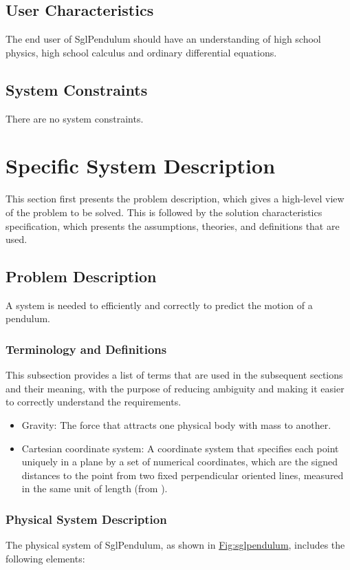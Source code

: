 \documentclass[12pt]{article}
\begin{document}
\subsection{User Characteristics}
\label{Sec:UserChars}
The end user of SglPendulum should have an understanding of high school physics, high school calculus and ordinary differential equations.

\subsection{System Constraints}
\label{Sec:SysConstraints}
There are no system constraints.

\section{Specific System Description}
\label{Sec:SpecSystDesc}
This section first presents the problem description, which gives a high-level view of the problem to be solved. This is followed by the solution characteristics specification, which presents the assumptions, theories, and definitions that are used.

\subsection{Problem Description}
\label{Sec:ProbDesc}
A system is needed to efficiently and correctly to predict the motion of a pendulum.

\subsubsection{Terminology and Definitions}
\label{Sec:TermDefs}
This subsection provides a list of terms that are used in the subsequent sections and their meaning, with the purpose of reducing ambiguity and making it easier to correctly understand the requirements.

\begin{itemize}
\item{Gravity: The force that attracts one physical body with mass to another.}
\item{Cartesian coordinate system: A coordinate system that specifies each point uniquely in a plane by a set of numerical coordinates, which are the signed distances to the point from two fixed perpendicular oriented lines, measured in the same unit of length (from \cite{cartesianWiki}).}
\end{itemize}
\subsubsection{Physical System Description}
\label{Sec:PhysSyst}
The physical system of SglPendulum, as shown in \hyperref[Figure:sglpendulum]{Fig:sglpendulum}, includes the following elements:
\end{document}
